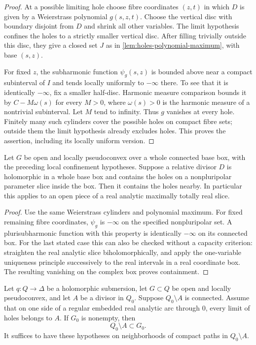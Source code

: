 \begin{proof}
At a possible limiting hole choose fibre coordinates $(z,t)$ in which $D$ is given by a Weierstrass polynomial $g(s,z,t)$. Choose the vertical disc with boundary disjoint from $D$ and shrink all other variables. The limit hypothesis confines the holes to a strictly smaller vertical disc. After filling trivially outside this disc, they give a closed set $J$ as in \cref{lem:holes-polynomial-maximum}, with base $(s,z)$.

For fixed $z$, the subharmonic function $\psi_g(s,z)$ is bounded above near a compact subinterval of $I$ and tends locally uniformly to $-\infty$ there. To see that it is identically $-\infty$, fix a smaller half-disc. Harmonic measure comparison bounds it by $C-M\omega(s)$ for every $M>0$, where $\omega(s)>0$ is the harmonic measure of a nontrivial subinterval. Let $M$ tend to infinity. Thus $g$ vanishes at every hole. Finitely many such cylinders cover the possible holes on compact fibre sets; outside them the limit hypothesis already excludes holes. This proves the assertion, including its locally uniform version.
\end{proof}

\begin{lemma}\label{lem:holes-interior-trapping}
Let $G$ be open and locally pseudoconvex over a whole connected base box, with the preceding local confinement hypotheses. Suppose a relative divisor $D$ is holomorphic in a whole base box and contains the holes on a nonpluripolar parameter slice inside the box. Then it contains the holes nearby. In particular this applies to an open piece of a real analytic maximally totally real slice.
\end{lemma}

\begin{proof}
Use the same Weierstrass cylinders and polynomial maximum. For fixed remaining fibre coordinates, $\psi_g$ is $-\infty$ on the specified nonpluripolar set. A plurisubharmonic function with this property is identically $-\infty$ on its connected box. For the last stated case this can also be checked without a capacity criterion: straighten the real analytic slice biholomorphically, and apply the one-variable uniqueness principle successively to the real intervals in a real coordinate box. The resulting vanishing on the complex box proves containment.
\end{proof}

\begin{lemma}
\label{lem:holes-tangency-propagation}
Let $q:Q\to\Delta$ be a holomorphic submersion, let $G\subset Q$ be open and locally pseudoconvex, and let $A$ be a divisor in $Q_0$. Suppose $Q_0\setminus A$ is connected. Assume that on one side of a regular embedded real analytic arc through $0$, every limit of holes belongs to $A$. If $G_0$ is nonempty, then
\[
 Q_0\setminus A\subset G_0.
\]
It suffices to have these hypotheses on neighborhoods of compact paths in $Q_0\setminus A$.
\end{lemma}

